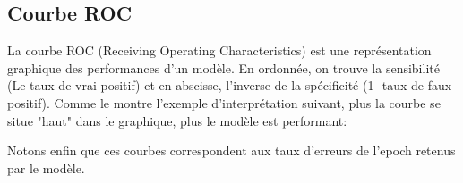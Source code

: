 \documentclass[a4paper,12pt]{report}
\begin{document}
      \subsection{Courbe ROC}
      La courbe ROC (Receiving Operating Characteristics) est une représentation graphique des performances d'un modèle. En ordonnée, on trouve la sensibilité (Le taux de vrai positif) et en abscisse, l'inverse de la spécificité (1- taux de faux positif). Comme le montre l'exemple d'interprétation suivant, plus la courbe se situe "haut" dans le graphique, plus le modèle est performant:
      \medbreak
      \begin{figure}[!h]%
        \centering
      \end{figure}%
      \bigbreak
      Notons enfin que ces courbes correspondent aux taux d'erreurs de l'epoch retenus par le modèle.
      \medbreak
\end{document}
